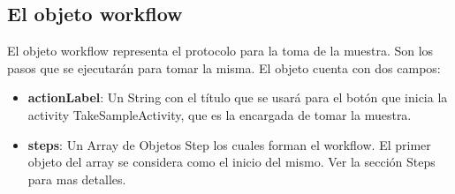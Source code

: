 	
\subsection{El objeto workflow}
	El objeto workflow representa el protocolo para la toma de la muestra. Son los pasos que se ejecutarán para tomar la misma.
	El objeto cuenta con dos campos:
		
	\begin{itemize}
	
		\item \textbf{actionLabel}: Un String con el título que se usará para el botón que inicia la activity TakeSampleActivity, que es la encargada de tomar la muestra.
		
		\item \textbf{steps}: Un Array de Objetos Step los cuales forman el workflow. El primer objeto del array se considera como el inicio del mismo. Ver la sección Steps para mas detalles.
	
	
	\end{itemize}	
	

		

